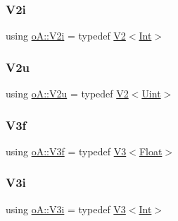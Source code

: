 \mbox{\label{namespaceo_a_aeddbfac9ac1bbff3d9640251439b33aa}} 
\subsubsection{\texorpdfstring{V2i}{V2i}}
{\footnotesize\ttfamily using \mbox{\hyperlink{namespaceo_a_aeddbfac9ac1bbff3d9640251439b33aa}{o\+A\+::\+V2i}} = typedef \mbox{\hyperlink{structo_a_1_1_v2}{V2}}$<$\mbox{\hyperlink{namespaceo_a_aa575525a7b0116822c73d43fa671a58c}{Int}}$>$}

\mbox{\label{namespaceo_a_a20f57c861441be662b592b15a492f29e}} 
\subsubsection{\texorpdfstring{V2u}{V2u}}
{\footnotesize\ttfamily using \mbox{\hyperlink{namespaceo_a_a20f57c861441be662b592b15a492f29e}{o\+A\+::\+V2u}} = typedef \mbox{\hyperlink{structo_a_1_1_v2}{V2}}$<$\mbox{\hyperlink{namespaceo_a_abe1d8250226c5cf34f84d7b75fc7922e}{Uint}}$>$}

\mbox{\label{namespaceo_a_a795c21de788620b8fb6c14bf3046dcf9}} 
\subsubsection{\texorpdfstring{V3f}{V3f}}
{\footnotesize\ttfamily using \mbox{\hyperlink{namespaceo_a_a795c21de788620b8fb6c14bf3046dcf9}{o\+A\+::\+V3f}} = typedef \mbox{\hyperlink{structo_a_1_1_v3}{V3}}$<$\mbox{\hyperlink{namespaceo_a_a513e9cb16924b482268ab3fcdf1f2499}{Float}}$>$}

\mbox{\label{namespaceo_a_a1b5e3fb31926401708aa4000145a58ef}} 
\subsubsection{\texorpdfstring{V3i}{V3i}}
{\footnotesize\ttfamily using \mbox{\hyperlink{namespaceo_a_a1b5e3fb31926401708aa4000145a58ef}{o\+A\+::\+V3i}} = typedef \mbox{\hyperlink{structo_a_1_1_v3}{V3}}$<$\mbox{\hyperlink{namespaceo_a_aa575525a7b0116822c73d43fa671a58c}{Int}}$>$}

